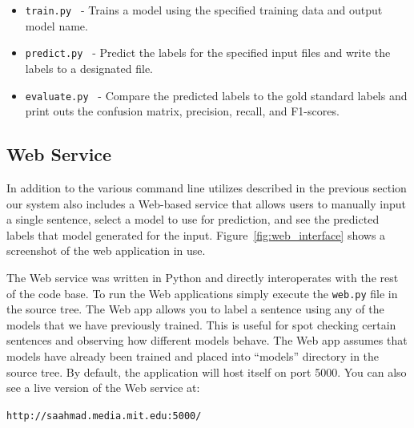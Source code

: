 \documentclass[preprint]{style}
\begin{document}
\begin{itemize}

\item {\tt train.py } -  Trains a model using the specified training data and output model name.

\item {\tt predict.py } -  Predict the labels for the specified input files and write the labels to a designated file.

\item {\tt evaluate.py } -  Compare the predicted labels to the gold standard labels and print outs the confusion matrix, precision, recall, and F1-scores. 

\end{itemize}


\subsection{Web Service}

In addition to the various command line utilizes described in the previous section our system also includes a Web-based service that allows users to manually input a single sentence, select a model to use for prediction, and see the predicted labels that model generated for the input. Figure~\ref{fig:web_interface} shows a screenshot of the web application in use.

The Web service was written in Python and directly interoperates with the rest of the code base. To run the Web applications simply execute the {\tt web.py} file in the source tree. The Web app allows you to label a sentence using any of the models that we have previously trained. This is useful for spot checking certain sentences and observing how different models behave. The Web app assumes that models have already been trained and placed into ``models'' directory in the source tree. By default, the application will host itself on port 5000. You can also see a live version of the Web service at:

{\tt http://saahmad.media.mit.edu:5000/ }
\end{document}
